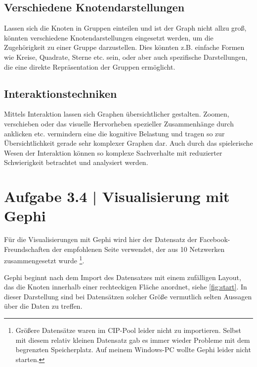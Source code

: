 \documentclass[a4paper,12pt,ngerman]{scrartcl}
\begin{document}
\subsection*{Verschiedene Knotendarstellungen}
Lassen sich die Knoten in Gruppen einteilen und ist der Graph nicht allzu groß, könnten verschiedene Knotendarstellungen eingesetzt werden, um die Zugehörigkeit zu einer Gruppe darzustellen. Dies könnten z.B. einfache Formen wie Kreise, Quadrate, Sterne etc. sein, oder aber auch spezifische Darstellungen, die eine direkte Repräsentation der Gruppen ermöglicht.

\subsection*{Interaktionstechniken}
Mittels Interaktion lassen sich Graphen übersichtlicher gestalten. Zoomen, verschieben oder das visuelle Hervorheben spezieller Zusammenhänge durch anklicken etc. vermindern eine die kognitive Belastung und tragen so zur Übersichtlichkeit gerade sehr komplexer Graphen dar. Auch durch das spielerische Wesen der Interaktion können so komplexe Sachverhalte mit reduzierter Schwierigkeit betrachtet und analysiert werden.

\section{Aufgabe 3.4 | Visualisierung mit Gephi}

%

Für die Visualisierungen mit Gephi wird hier der Datensatz der Facebook-Freundschaften der empfohlenen Seite verwendet, der aus 10 Netzwerken zusammengesetzt wurde \footnote{Größere Datensätze waren im CIP-Pool leider nicht zu importieren. Selbst mit diesem relativ kleinen Datensatz gab es immer wieder Probleme mit dem begrenzten Speicherplatz. Auf meinem Windows-PC wollte Gephi leider nicht starten.}.

Gephi beginnt nach dem Import des Datensatzes mit einem zufälligen Layout, das die Knoten innerhalb einer rechteckigen Fläche anordnet, siehe \cref{fig:start}. In dieser Darstellung sind bei Datensätzen solcher Größe vermutlich selten Aussagen über die Daten zu treffen.
\end{document}
